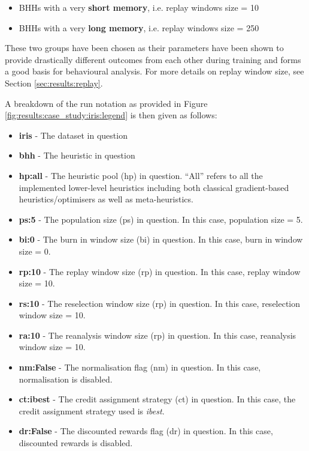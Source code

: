 \begin{itemize}
    \item \Acp{BHH} with a very \textbf{short memory}, i.e. replay windows size = 10
    \item \Acp{BHH} with a very \textbf{long memory}, i.e. replay windows size = 250
\end{itemize}

These two groups have been chosen as their parameters have been shown to provide drastically different outcomes from each other during training and forms a good basis for behavioural analysis. For more details on replay window size, see Section \ref{sec:results:replay}.

A breakdown of the run notation as provided in Figure \ref{fig:results:case_study:iris:legend} is then given as follows:

\begin{itemize}
    \item \textbf{iris} - The dataset in question
    \item \textbf{bhh} - The heuristic in question
    \item \textbf{hp:all} - The heuristic pool (hp) in question. ``All'' refers to all the implemented lower-level heuristics including both classical gradient-based heuristics/optimisers as well as meta-heuristics.
    \item \textbf{ps:5} - The population size (ps) in question. In this case, population size = 5.
    \item \textbf{bi:0} - The burn in window size (bi) in question. In this case, burn in window size = 0.
    \item \textbf{rp:10} - The replay window size (rp) in question. In this case, replay window size = 10.
    \item \textbf{rs:10} - The reselection window size (rp) in question. In this case, reselection window size = 10.
    \item \textbf{ra:10} - The reanalysis window size (rp) in question. In this case, reanalysis window size = 10.
    \item \textbf{nm:False} - The normalisation flag (nm) in question. In this case, normalisation is disabled.
    \item \textbf{ct:ibest} - The credit assignment strategy (ct) in question. In this case, the credit assignment strategy used is \textit{ibest}.
    \item \textbf{dr:False} - The discounted rewards flag (dr) in question. In this case, discounted rewards is disabled.
\end{itemize}

